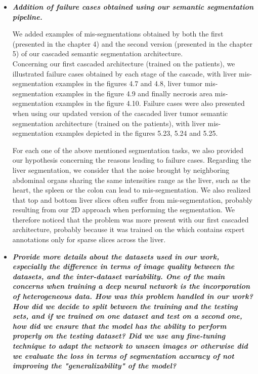 \documentclass{article}
\begin{document}
\begin{itemize}
\item \textit{\textbf{Addition of failure cases obtained using our semantic segmentation pipeline.}}


We added examples of mis-segmentations obtained by both the first (presented in the chapter 4) and the second version (presented in the chapter 5) of our cascaded semantic segmentation architecture.\\
Concerning our first cascaded architecture (trained on the  patients), we illustrated failure cases obtained by each stage of the cascade, with liver mis-segmentation examples in the figures 4.7 and 4.8, liver tumor mis-segmentation examples in the figure 4.9 and finally necrosis area mis-segmentation examples in the figure 4.10.
Failure cases were also presented when using our updated version of the cascaded liver tumor semantic segmentation architecture (trained on the  patients), with liver mis-segmentation examples depicted in the figures 5.23, 5.24 and 5.25. 

For each one of the above mentioned segmentation tasks, we also provided our hypothesis concerning the reasons leading to failure cases.
Regarding the liver segmentation, we consider that the noise brought by neighboring abdominal organs sharing the same intensities range as the liver, such as the heart, the spleen or the colon can lead to mis-segmentation. We also realized that top and bottom liver slices often suffer from mis-segmentation, probably resulting from our 2D approach when performing the segmentation. We therefore noticed that the problem was more present with our first cascaded architecture, probably because it was trained on the  which contains expert annotations only for sparse slices across the liver.

\item \textit{\textbf{Provide more details about the datasets used in our work, especially the difference in terms of image quality between the datasets, and the inter-dataset variability. One of the main concerns when training a deep neural network is the incorporation of heterogeneous data. How was this problem handled in our work? How did we decide to split between the training and the testing sets, and if we trained on one dataset and test on a second one, how did we ensure that the model has the ability to perform properly on the testing dataset? Did we use any fine-tuning technique to adapt the network to unseen images or otherwise did we evaluate the loss in terms of segmentation accuracy of not improving the "generalizability" of the model?}}  


\end{itemize}
\end{document}
